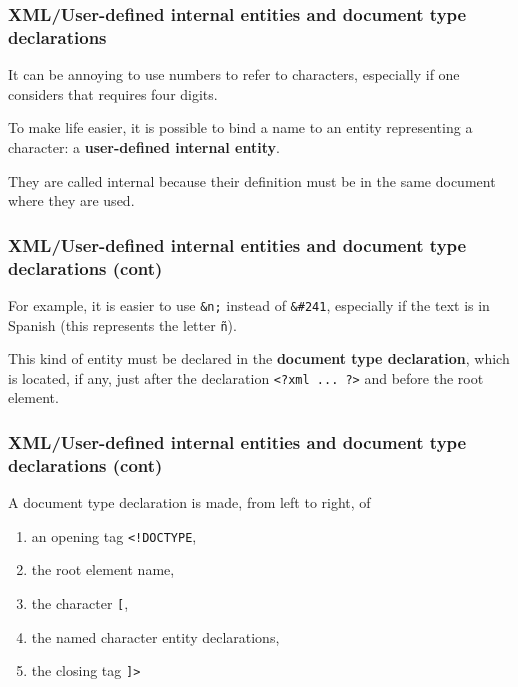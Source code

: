 %
\begin{frame}[containsverbatim]
\frametitle{XML/User-defined internal entities and document type declarations}

It can be annoying to use numbers to refer to characters, especially
if one considers that \Unicode requires four digits.

\bigskip

To make life easier, it is possible to bind a name to an entity
representing a character: a \textbf{user-defined internal entity}.

\bigskip

They are called internal because their definition must be in the same
document where they are used.

\end{frame}


%
\begin{frame}[containsverbatim]
\frametitle{XML/User-defined internal entities and document type declarations (cont)}

For example, it is easier to use \verb|&n;| instead of \verb|&#241|,
especially if the text is in Spanish (this represents the letter
\texttt{\~{n}}).

\bigskip

This kind of entity must be declared in the \textbf{document type
declaration}, which is located, if any, just after the declaration
\verb|<?xml ... ?>| and before the root element.

\end{frame}

%
\begin{frame}[containsverbatim]
\frametitle{XML/User-defined internal entities and document type declarations
  (cont)}
\label{xml_intro:DOCTYPE}

A document type declaration is made, from left to right, of
\begin{enumerate}

  \item an opening tag \verb|<!DOCTYPE|,

  \item the root element name,

  \item the character \verb|[|,
  
  \item the named character entity declarations,

  \item the closing tag \verb|]>|

\end{enumerate}

\end{frame}


